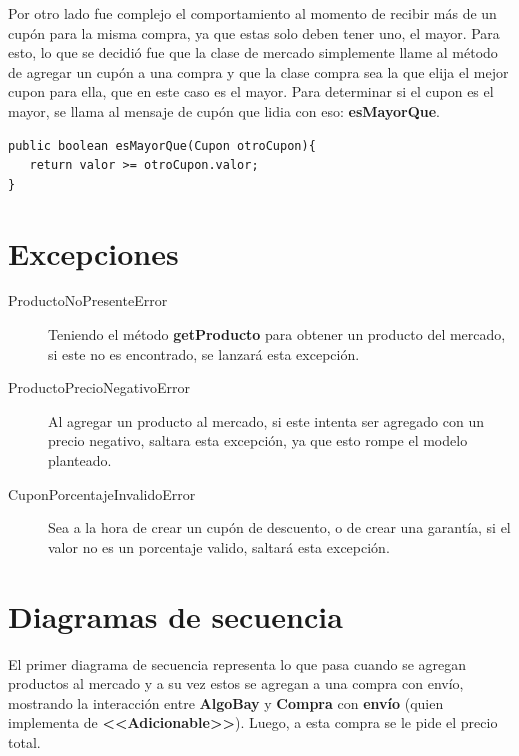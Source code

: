 \documentclass[titlepage,a4paper]{article}
\begin{document}
Por otro lado fue complejo el comportamiento al momento de recibir más de un cupón para la misma compra, ya que estas solo deben tener uno, el mayor. Para esto, lo que se decidió fue que la clase de mercado simplemente llame al método de agregar un cupón a una compra y que la clase compra sea la que elija el mejor cupon para ella, que en este caso es el mayor. Para determinar si el cupon es el mayor, se llama al mensaje de cupón que lidia con eso: \textbf{esMayorQue}.

\begin{verbatim}
public boolean esMayorQue(Cupon otroCupon){
   return valor >= otroCupon.valor;
}
\end{verbatim}

\section{Excepciones}\label{sec:excepciones}

\begin{description}
\item[ProductoNoPresenteError] Teniendo el método \textbf{getProducto} para obtener un producto del mercado, si este no es encontrado, se lanzará esta excepción.
\item[ProductoPrecioNegativoError] Al agregar un producto al mercado, si este intenta ser agregado con un precio negativo, saltara esta excepción, ya que esto rompe el modelo planteado.
\item[CuponPorcentajeInvalidoError] Sea a la hora de crear un cupón de descuento, o de crear una garantía, si el valor no es un porcentaje valido, saltará esta excepción.
\end{description}

\section{Diagramas de secuencia}\label{sec:diagramasdesecuencia}

El primer diagrama de secuencia representa lo que pasa cuando se agregan productos al mercado y a su vez estos se agregan a una compra con envío, mostrando la interacción entre \textbf{AlgoBay} y \textbf{Compra} con \textbf{envío} (quien implementa de \textbf{<<Adicionable>>}). Luego, a esta compra se le pide el precio total.
\end{document}
